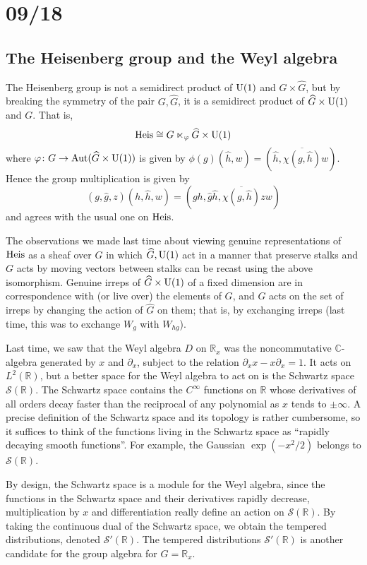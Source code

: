 \documentclass[../../rtnotes.tex]{subfiles}
\begin{document}
\section{09/18}
\subsection{The Heisenberg group and the Weyl algebra}
The Heisenberg group is not a semidirect product of $\operatorname{U}(1)$ and $G\times\widehat G$, but by breaking the symmetry of the pair $G,\widehat G$, it is a semidirect product of $\widehat G\times \operatorname{U}(1)$ and $G$. That is, 
\[\operatorname{Heis} \cong G \ltimes_\varphi \widehat G\times \operatorname{U}(1)\]
where $\varphi\colon G\to \operatorname{Aut}(\widehat G\times \operatorname{U}(1))$ is given by $\phi(g)(\hat h,w) = (\hat h,\overline{\chi(g,\hat h)}w)$. Hence the group multiplication is given by 
\[(g,\hat g,z)(h,\hat h,w) = (gh,\hat g \hat h, \overline{\chi(g,\hat h)}zw)\] 
and agrees with the usual one on $\operatorname{Heis}$.

The observations we made last time about viewing genuine representations of $\operatorname{Heis}$ as a sheaf over $G$ in which $\widehat G, \operatorname{U}(1)$ act in a manner that preserve stalks and $G$ acts by moving vectors between stalks can be recast using the above isomorphism. Genuine irreps of $\widehat G\times \operatorname{U}(1)$ of a fixed dimension are in correspondence with (or live over) the elements of $G$, and $G$ acts on the set of irreps by changing the action of $\widehat G$ on them; that is, by exchanging irreps (last time, this was to exchange $W_g$ with $W_{hg}$).

Last time, we saw that the Weyl algebra $D$ on $\mathbb R_x$ was the noncommutative $\mathbb C$-algebra generated by $x$ and $\partial_x$, subject to the relation $\partial_xx-x\partial_x = 1$. It acts on $L^2(\mathbb R)$, but a better space for the Weyl algebra to act on is the Schwartz space $\mathcal S(\mathbb R)$. The Schwartz space contains the $C^\infty$ functions on $\mathbb R$ whose derivatives of all orders decay faster than the reciprocal of any polynomial as $x$ tends to $\pm \infty$. A precise definition of the Schwartz space and its topology is rather cumbersome, so it suffices to think of the functions living in the Schwartz space as ``rapidly decaying smooth functions''. For example, the Gaussian $\exp(-x^2/2)$ belongs to $\mathcal S(\mathbb R)$.

By design, the Schwartz space is a module for the Weyl algebra, since the functions in the Schwartz space and their derivatives rapidly decrease, multiplication by $x$ and differentiation really define an action on $\mathcal S(\mathbb R)$. By taking the continuous dual of the Schwartz space, we obtain the tempered distributions, denoted $\mathcal S'(\mathbb R)$. The tempered distributions $\mathcal S'(\mathbb R)$ is another candidate for the group algebra for $G = \mathbb R_x$. 
\end{document}
